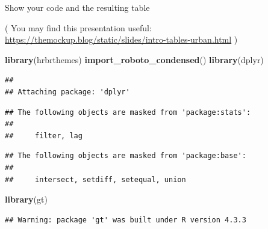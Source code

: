 \documentclass[
]{article}
\newenvironment{Shaded}{\begin{snugshade}}{\end{snugshade}}
\newcommand{\FunctionTok}[1]{\textcolor[rgb]{0.13,0.29,0.53}{\textbf{#1}}}
\newcommand{\NormalTok}[1]{#1}
\begin{document}
Show your code and the resulting table

( You may find this presentation useful:
\url{https://themockup.blog/static/slides/intro-tables-urban.html} )

\begin{Shaded}
\begin{Highlighting}[]
\FunctionTok{library}\NormalTok{(hrbrthemes)}
\FunctionTok{import\_roboto\_condensed}\NormalTok{()}
\FunctionTok{library}\NormalTok{(dplyr)}
\end{Highlighting}
\end{Shaded}

\begin{verbatim}
## 
## Attaching package: 'dplyr'
\end{verbatim}

\begin{verbatim}
## The following objects are masked from 'package:stats':
## 
##     filter, lag
\end{verbatim}

\begin{verbatim}
## The following objects are masked from 'package:base':
## 
##     intersect, setdiff, setequal, union
\end{verbatim}

\begin{Shaded}
\begin{Highlighting}[]
\FunctionTok{library}\NormalTok{(gt)}
\end{Highlighting}
\end{Shaded}

\begin{verbatim}
## Warning: package 'gt' was built under R version 4.3.3
\end{verbatim}
\end{document}
